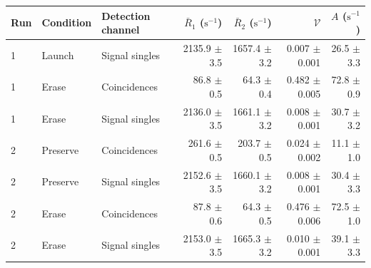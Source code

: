 \begin{tabular}{lllrrrr}
\toprule
Run & Condition & Detection channel & $\bar R_1$ ($\mathrm{s}^{-1}$) & $\bar R_2$ ($\mathrm{s}^{-1}$) & $\mathcal{V}$ & $A$ ($\mathrm{s}^{-1}$) \\
\midrule
1 & Launch & Signal singles & 2135.9 \ensuremath{\pm} 3.5 & 1657.4 \ensuremath{\pm} 3.2 & 0.007 \ensuremath{\pm} 0.001 & 26.5 \ensuremath{\pm} 3.3 \\
1 & Erase & Coincidences & 86.8 \ensuremath{\pm} 0.5 & 64.3 \ensuremath{\pm} 0.4 & 0.482 \ensuremath{\pm} 0.005 & 72.8 \ensuremath{\pm} 0.9 \\
1 & Erase & Signal singles & 2136.0 \ensuremath{\pm} 3.5 & 1661.1 \ensuremath{\pm} 3.2 & 0.008 \ensuremath{\pm} 0.001 & 30.7 \ensuremath{\pm} 3.2 \\
2 & Preserve & Coincidences & 261.6 \ensuremath{\pm} 0.5 & 203.7 \ensuremath{\pm} 0.5 & 0.024 \ensuremath{\pm} 0.002 & 11.1 \ensuremath{\pm} 1.0 \\
2 & Preserve & Signal singles & 2152.6 \ensuremath{\pm} 3.5 & 1660.1 \ensuremath{\pm} 3.2 & 0.008 \ensuremath{\pm} 0.001 & 30.4 \ensuremath{\pm} 3.3 \\
2 & Erase & Coincidences & 87.8 \ensuremath{\pm} 0.6 & 64.3 \ensuremath{\pm} 0.5 & 0.476 \ensuremath{\pm} 0.006 & 72.5 \ensuremath{\pm} 1.0 \\
2 & Erase & Signal singles & 2153.0 \ensuremath{\pm} 3.5 & 1665.3 \ensuremath{\pm} 3.2 & 0.010 \ensuremath{\pm} 0.001 & 39.1 \ensuremath{\pm} 3.3 \\
\bottomrule
\end{tabular}
